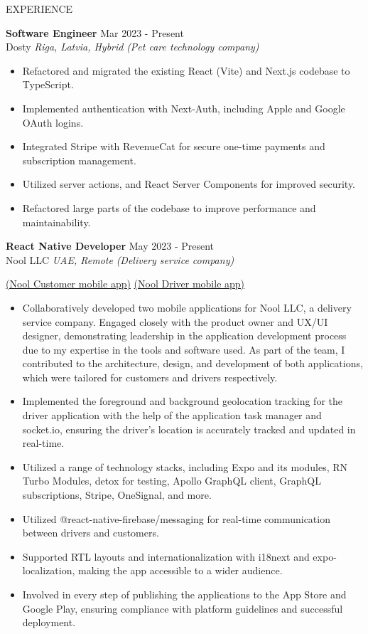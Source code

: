 \documentclass{resume} %
\begin{document}
\begin{rSection}{EXPERIENCE}

\textbf{Software Engineer} \hfill Mar 2023 - Present\\
Dosty \hfill \textit{Riga, Latvia, Hybrid}
\textit{(Pet care technology company)}
 \begin{itemize}
    \itemsep -3pt {} 
        \item Refactored and migrated the existing React (Vite) and Next.js codebase to TypeScript.
        \item Implemented authentication with Next-Auth, including Apple and Google OAuth logins.
        \item Integrated Stripe with RevenueCat for secure one-time payments and subscription management.
        \item Utilized server actions, and React Server Components for improved security.
        \item Refactored large parts of the codebase to improve performance and maintainability.
 \end{itemize}

\textbf{React Native Developer} \hfill May 2023 - Present\\
Nool LLC \hfill \textit{UAE, Remote}
\textit{(Delivery service company)}

\href{https://apps.apple.com/us/app/nool/id6478508548}{(Nool Customer mobile app)}
\href{https://apps.apple.com/us/app/nool-driver/id6478509151}{(Nool Driver mobile app)}
 \begin{itemize}
    \itemsep -3pt {} 
        \item Collaboratively developed two mobile applications for Nool LLC, a delivery service company. Engaged closely with the product owner and UX/UI designer, demonstrating leadership in the application development process due to my expertise in the tools and software used. As part of the team, I contributed to the architecture, design, and development of both applications, which were tailored for customers and drivers respectively.
        \item Implemented the foreground and background geolocation tracking for the driver application with the help of the application task manager and socket.io, ensuring the driver's location is accurately tracked and updated in real-time.
        \item Utilized a range of technology stacks, including Expo and its modules, RN Turbo Modules, detox for testing, Apollo GraphQL client, GraphQL subscriptions, Stripe, OneSignal, and more.
        \item Utilized @react-native-firebase/messaging for real-time communication between drivers and customers.
        \item Supported RTL layouts and internationalization with i18next and expo-localization, making the app accessible to a wider audience. 
        \item Involved in every step of publishing the applications to the App Store and Google Play, ensuring compliance with platform guidelines and successful deployment.
 \end{itemize}


\end{rSection}
\end{document}

